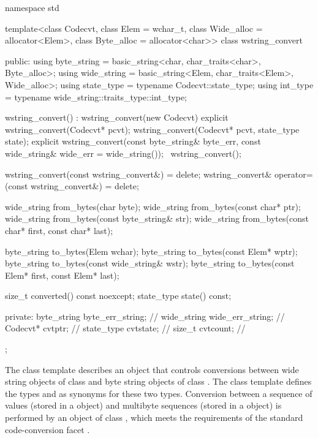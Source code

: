 %
\begin{codeblock}
namespace std {
  template<class Codecvt, class Elem = wchar_t,
           class Wide_alloc = allocator<Elem>,
           class Byte_alloc = allocator<char>>
    class wstring_convert {
    public:
      using byte_string = basic_string<char, char_traits<char>, Byte_alloc>;
      using wide_string = basic_string<Elem, char_traits<Elem>, Wide_alloc>;
      using state_type  = typename Codecvt::state_type;
      using int_type    = typename wide_string::traits_type::int_type;

      wstring_convert() : wstring_convert(new Codecvt) {}
      explicit wstring_convert(Codecvt* pcvt);
      wstring_convert(Codecvt* pcvt, state_type state);
      explicit wstring_convert(const byte_string& byte_err,
                               const wide_string& wide_err = wide_string());
      ~wstring_convert();

      wstring_convert(const wstring_convert&) = delete;
      wstring_convert& operator=(const wstring_convert&) = delete;

      wide_string from_bytes(char byte);
      wide_string from_bytes(const char* ptr);
      wide_string from_bytes(const byte_string& str);
      wide_string from_bytes(const char* first, const char* last);

      byte_string to_bytes(Elem wchar);
      byte_string to_bytes(const Elem* wptr);
      byte_string to_bytes(const wide_string& wstr);
      byte_string to_bytes(const Elem* first, const Elem* last);

      size_t converted() const noexcept;
      state_type state() const;

    private:
      byte_string byte_err_string;  // \expos
      wide_string wide_err_string;  // \expos
      Codecvt* cvtptr;              // \expos
      state_type cvtstate;          // \expos
      size_t cvtcount;              // \expos
    };
}
\end{codeblock}

\pnum
The class template describes an object that controls conversions between wide
string objects of class  and byte string objects of class . The class template defines the types
 and  as synonyms for these two types.
Conversion between a sequence of  values (stored in a
 object) and multibyte sequences (stored in a
 object) is performed by an object of class
, which meets the
requirements of the standard code-conversion facet .

